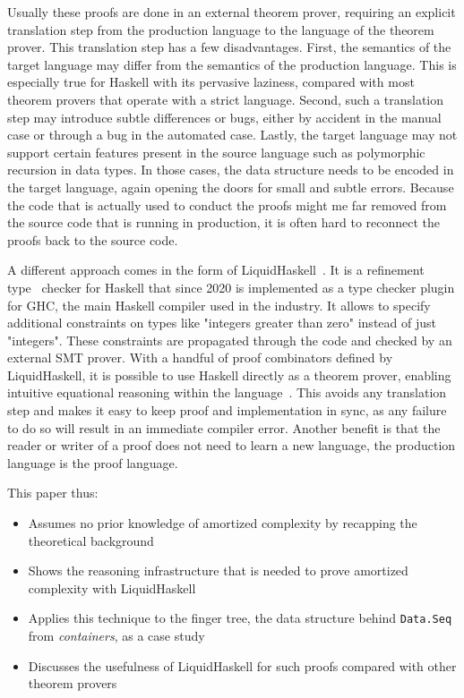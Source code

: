 \documentclass[sigplan,screen]{acmart}
\begin{document}
Usually these proofs are done in an external theorem prover, requiring an explicit translation step from the production language to the language of the theorem prover. This translation step has a few disadvantages. First, the semantics of the target language may differ from the semantics of the production language. This is especially true for Haskell with its pervasive laziness, compared with most theorem provers that operate with a strict language. Second, such a translation step may introduce subtle differences or bugs, either by accident in the manual case or through a bug in the automated case. Lastly, the target language may not support certain features present in the source language such as polymorphic recursion in data types. In those cases, the data structure needs to be encoded in the target language, again opening the doors for small and subtle errors. Because the code that is actually used to conduct the proofs might me far removed from the source code that is running in production, it is often hard to reconnect the proofs back to the source code.

A different approach comes in the form of LiquidHaskell~\cite{liquidhaskell}. It is a refinement type~\cite{refinement_types} checker for Haskell that since 2020 is implemented as a type checker plugin for GHC, the main Haskell compiler used in the industry. It allows to specify additional constraints on types like "integers greater than zero" instead of just "integers". These constraints are propagated through the code and checked by an external SMT prover. With a handful of proof combinators defined by LiquidHaskell, it is possible to use Haskell directly as a theorem prover, enabling intuitive equational reasoning within the language~\cite{tpfa}. This avoids any translation step and makes it easy to keep proof and implementation in sync, as any failure to do so will result in an immediate compiler error. Another benefit is that the reader or writer of a proof does not need to learn a new language, the production language is the proof language.

This paper thus:
\begin{itemize}
\item{Assumes no prior knowledge of amortized complexity by recapping the theoretical background}
\item{Shows the reasoning infrastructure that is needed to prove amortized complexity with LiquidHaskell}
\item{Applies this technique to the finger tree, the data structure behind \texttt{Data.Seq} from \textit{containers}, as a case study}
\item{Discusses the usefulness of LiquidHaskell for such proofs compared with other theorem provers}
\end{itemize}
\end{document}
